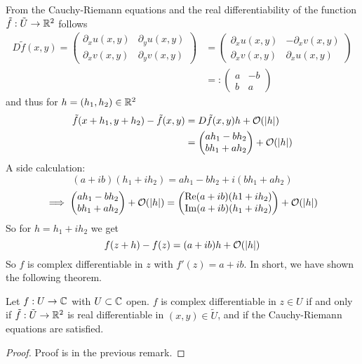 \documentclass[../../script.tex]{subfiles}
\begin{document}
\begin{rem}
    From the Cauchy-Riemann equations and the real differentiability of the function $\tilde{f}: \tilde{U} \rightarrow \mathbb{R}^2$ follows
    \begin{align*}
        D\tilde{f}(x, y) = \begin{pmatrix}
            \partial_x u(x, y) & \partial_y u(x, y) \\
            \partial_x v(x, y) & \partial_y v(x, y)
        \end{pmatrix} &= \begin{pmatrix}
            \partial_x u(x, y) & -\partial_x v(x, y) \\
            \partial_x v(x, y) & \partial_x u(x, y)
        \end{pmatrix} \\
        &=: \begin{pmatrix}
            a & -b \\ 
            b & a
        \end{pmatrix}
    \end{align*}
    and thus for $h = (h_1, h_2) \in \mathbb{R}^2$ 
    \begin{align*}
        \tilde{f}(x + h_1, y + h_2) - \tilde{f}(x, y) &= D\tilde{f}(x, y) h + \mathcal{O}(\abs{h}) \\
        &= \begin{pmatrix}
            ah_1 - bh_2 \\ 
            bh_1 + ah_2
        \end{pmatrix} + \mathcal{O}(\abs{h})
    \end{align*}
    A side calculation:
    \[
        (a +ib)(h_1 + ih_2) = ah_1 - bh_2 + i(bh_1 + ah_2)
    \]
    \[
        \implies \begin{pmatrix}
            ah_1 - bh_2 \\
            bh_1 + ah_2
        \end{pmatrix} + \mathcal{O}(\abs{h}) = 
        \begin{pmatrix}
            \Re(a + ib)(h1 + ih_2) \\
            \Im(a + ib)(h_1 + ih_2)
        \end{pmatrix} + \mathcal{O}(\abs{h})
    \]
    So for $h = h_1 + ih_2$ we get 
    \[
        f(z + h) - f(z) = (a + ib)h + \mathcal{O}(\abs{h})
    \]
    So $f$ is complex differentiable in $z$ with $f'(z) = a + ib$. In short, we have shown the following theorem.
\end{rem}

\begin{thm}
    Let $f: U \rightarrow \mathbb{C}$ with $U \subset \mathbb{C}$ open. $f$ is complex differentiable in $z \in U$ if and only if
    $\tilde{f}: \tilde{U} \rightarrow \mathbb{R}^2$ is real differentiable in $(x, y) \in \tilde{U}$, and if the Cauchy-Riemann equations are satisfied.
\end{thm}
\begin{proof}
    Proof is in the previous remark.
\end{proof}
\end{document}
